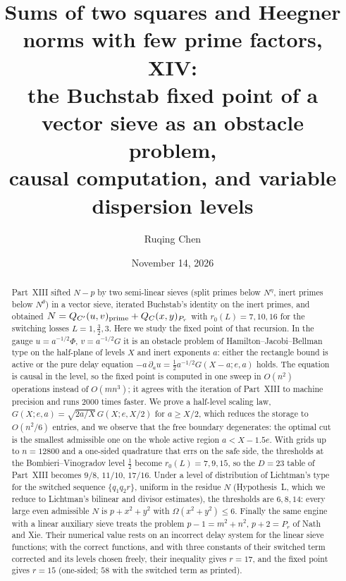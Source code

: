 \documentclass[11pt]{amsart}
\title[Sums of two squares and Heegner norms, XIV]{Sums of two squares and Heegner norms with few prime factors, XIV:\\ the Buchstab fixed point of a vector sieve as an obstacle problem,\\ causal computation, and variable dispersion levels}
\author{Ruqing Chen}
\date{November 14, 2026}
\theoremstyle{remark}
\begin{document}
\begin{abstract}
Part~XIII sifted $N-p$ by two semi-linear sieves (split primes below $N^\eta$, inert primes below $N^\theta$) in a vector sieve, iterated Buchstab's identity on the inert primes, and obtained $N=Q_{C'}(u,v)_{\rm prime}+Q_C(x,y)_{P_r}$ with $r_0(L)=7,10,16$ for the switching losses $L=1,\frac32,3$. Here we study the fixed point of that recursion. In the gauge $u=a^{-1/2}\Phi$, $v=a^{-1/2}G$ it is an obstacle problem of Hamilton--Jacobi--Bellman type on the half-plane of levels $X$ and inert exponents $a$: either the rectangle bound is active or the pure delay equation $-a\,\partial_au=\frac12a^{-1/2}G(X-a;e,a)$ holds. The equation is causal in the level, so the fixed point is computed in one sweep in $O(n^2)$ operations instead of $O(mn^3)$; it agrees with the iteration of Part~XIII to machine precision and runs $2000$ times faster. We prove a half-level scaling law, $G(X;e,a)=\sqrt{2a/X}\,G(X;e,X/2)$ for $a\ge X/2$, which reduces the storage to $O(n^2/6)$ entries, and we observe that the free boundary degenerates: the optimal cut is the smallest admissible one on the whole active region $a<X-1.5e$. With grids up to $n=12800$ and a one-sided quadrature that errs on the safe side, the thresholds at the Bombieri--Vinogradov level $\frac12$ become $r_0(L)=7,9,15$, so the $D=23$ table of Part~XIII becomes $9/8$, $11/10$, $17/16$. Under a level of distribution of Lichtman's type for the switched sequence $\{q_1q_2r\}$, uniform in the residue $N$ (Hypothesis~L, which we reduce to Lichtman's bilinear and divisor estimates), the thresholds are $6,8,14$: every large even admissible $N$ is $p+x^2+y^2$ with $\Omega(x^2+y^2)\le6$. Finally the same engine with a linear auxiliary sieve treats the problem $p-1=m^2+n^2$, $p+2=P_r$ of Nath and Xie. Their numerical value rests on an incorrect delay system for the linear sieve functions; with the correct functions, and with three constants of their switched term corrected and its levels chosen freely, their inequality gives $r=17$, and the fixed point gives $r=15$ (one-sided; $58$ with the switched term as printed).
\end{abstract}
\maketitle
\end{document}
